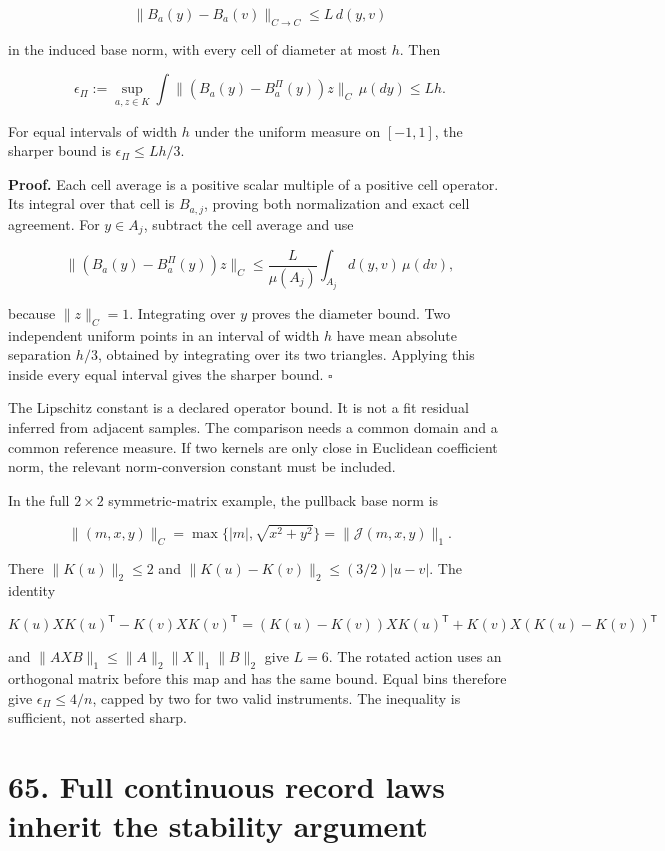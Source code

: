 \documentclass[11pt,letterpaper]{article}
\begin{document}
\[
\|B_a(y)-B_a(v)\|_{C\to C}\leq L\,d(y,v)
\]

in the induced base norm, with every cell of diameter at most \(h\).
Then

\[
\epsilon_\Pi:=\sup_{a,z\in K}\int
\|(B_a(y)-B_a^\Pi(y))z\|_C\,\mu(dy)
\leq Lh.
\]

For equal intervals of width \(h\) under the uniform measure on
\([-1,1]\), the sharper bound is \(\epsilon_\Pi\leq Lh/3\).

\textbf{Proof.} Each cell average is a positive scalar multiple of a
positive cell operator. Its integral over that cell is \(B_{a,j}\),
proving both normalization and exact cell agreement. For \(y\in A_j\),
subtract the cell average and use

\[
\|(B_a(y)-B_a^\Pi(y))z\|_C
\leq\frac{L}{\mu(A_j)}\int_{A_j}d(y,v)\,\mu(dv),
\]

because \(\|z\|_C=1\). Integrating over \(y\) proves the diameter bound.
Two independent uniform points in an interval of width \(h\) have mean
absolute separation \(h/3\), obtained by integrating over its two
triangles. Applying this inside every equal interval gives the sharper
bound. \(\square\)

The Lipschitz constant is a declared operator bound. It is not a fit
residual inferred from adjacent samples. The comparison needs a common
domain and a common reference measure. If two kernels are only close in
Euclidean coefficient norm, the relevant norm-conversion constant must
be included.

In the full \(2\times2\) symmetric-matrix example, the pullback base
norm is

\[
\|(m,x,y)\|_C=\max\{|m|,\sqrt{x^2+y^2}\}=\|\mathcal J(m,x,y)\|_1.
\]

There \(\|K(u)\|_2\leq2\) and \(\|K(u)-K(v)\|_2\leq(3/2)|u-v|\). The
identity

\[
K(u)XK(u)^{\mathsf T}-K(v)XK(v)^{\mathsf T}
=(K(u)-K(v))XK(u)^{\mathsf T}
+K(v)X(K(u)-K(v))^{\mathsf T}
\]

and \(\|AXB\|_1\leq\|A\|_2\|X\|_1\|B\|_2\) give \(L=6\). The rotated
action uses an orthogonal matrix before this map and has the same bound.
Equal bins therefore give \(\epsilon_\Pi\leq4/n\), capped by two for two
valid instruments. The inequality is sufficient, not asserted sharp.

\section{65. Full continuous record laws inherit the stability
argument}\label{full-continuous-record-laws-inherit-the-stability-argument}
\end{document}
